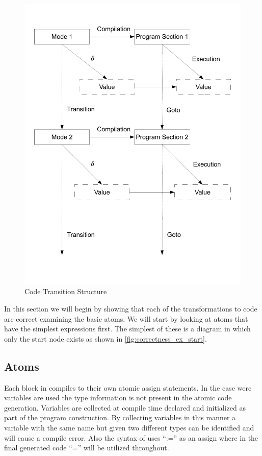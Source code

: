 \begin{figure}[htb]
    \centering
    \includegraphics[trim= 10mm 30mm 10mm 10mm, clip, width=\imgmedium]{./images/correctness_graph2.pdf}
    \caption{Code Transition Structure}
    \label{fig:correctness_graph2}
\end{figure}

In this section we will begin by showing that each of the transformations to code are correct examining the basic atoms. We will start by looking at atoms that have the simplest expressions first. The simplest of these is a diagram in which only the start node exists as shown in \ref{fig:correctness_ex_start}.

\clearpage
\subsection{Atoms}

Each block in \plccharts compiles to their own atomic assign statements. In the case were variables are used the type information is not present in the atomic code generation. Variables are collected at compile time declared and initialized as part of the program construction. By collecting variables in this manner a variable with the same name but given two different types can be identified and will cause a compile error. Also the syntax of \plccharts uses ``:='' as an assign where in the final generated code ``='' will be utilized throughout.

